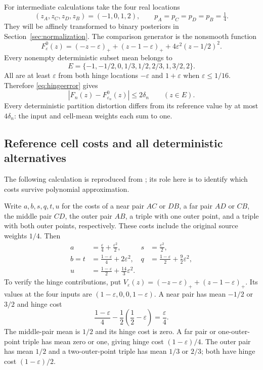 \documentclass[11pt]{article}
\theoremstyle{definition}\newtheorem{definition}[theorem]{Definition}
\theoremstyle{remark}\newtheorem{remark}[theorem]{Remark}
\begin{document}
For intermediate calculations take the four real locations
\[
(z_A,z_C,z_D,z_B)=(-1,0,1,2),\qquad p_A=p_C=p_D=p_B=\tfrac14.
\]
They will be affinely transformed to binary posteriors in Section~\ref{sec:normalization}. The comparison generator is the nonsmooth function
\begin{equation}
F_\varepsilon^0(z)=(-z-\varepsilon)_++(z-1-\varepsilon)_+
+4\varepsilon^2(z-1/2)^2.
\label{eq:reference}
\end{equation}
Every nonempty deterministic subset mean belongs to
\begin{equation}
E=\{-1,-1/2,0,1/3,1/2,2/3,1,3/2,2\}.
\label{eq:means}
\end{equation}
All are at least $\varepsilon$ from both hinge locations $-\varepsilon$ and $1+\varepsilon$ when $\varepsilon\le1/16$. Therefore \eqref{eq:hingeerror} gives
\[
|F_n(z)-F_{\varepsilon_n}^0(z)|\le2\delta_n\qquad(z\in E).
\]
Every deterministic partition distortion differs from its reference value by at most $4\delta_n$: the input and cell-mean weights each sum to one.

\subsection{Reference cell costs and all deterministic alternatives}
\label{sec:gadget}
The following calculation is reproduced from \cite[Lemma 4.2]{huang7}; its role here is to identify which costs survive polynomial approximation.

Write $a,b,s,q,t,u$ for the costs of a near pair $AC$ or $DB$, a far pair $AD$ or $CB$, the middle pair $CD$, the outer pair $AB$, a triple with one outer point, and a triple with both outer points, respectively. These costs include the original source weights $1/4$. Then
\begin{align}
a&=\frac\varepsilon4+\frac{\varepsilon^2}2,
&s&=\frac{\varepsilon^2}2,\label{eq:costs}\\
b=t&=\frac{1-\varepsilon}4+2\varepsilon^2,
&q&=\frac{1-\varepsilon}2+\frac92\varepsilon^2,\nonumber\\
u&=\frac{1-\varepsilon}2+\frac{14}3\varepsilon^2.&&\nonumber
\end{align}
To verify the hinge contributions, put $V_\varepsilon(z)=(-z-\varepsilon)_++(z-1-\varepsilon)_+$. Its values at the four inputs are $(1-\varepsilon,0,0,1-\varepsilon)$. A near pair has mean $-1/2$ or $3/2$ and hinge cost
\[
\frac{1-\varepsilon}4-\frac12\left(\frac12-\varepsilon\right)=\frac\varepsilon4.
\]
The middle-pair mean is $1/2$ and its hinge cost is zero. A far pair or one-outer-point triple has mean zero or one, giving hinge cost $(1-\varepsilon)/4$. The outer pair has mean $1/2$ and a two-outer-point triple has mean $1/3$ or $2/3$; both have hinge cost $(1-\varepsilon)/2$.
\end{document}

